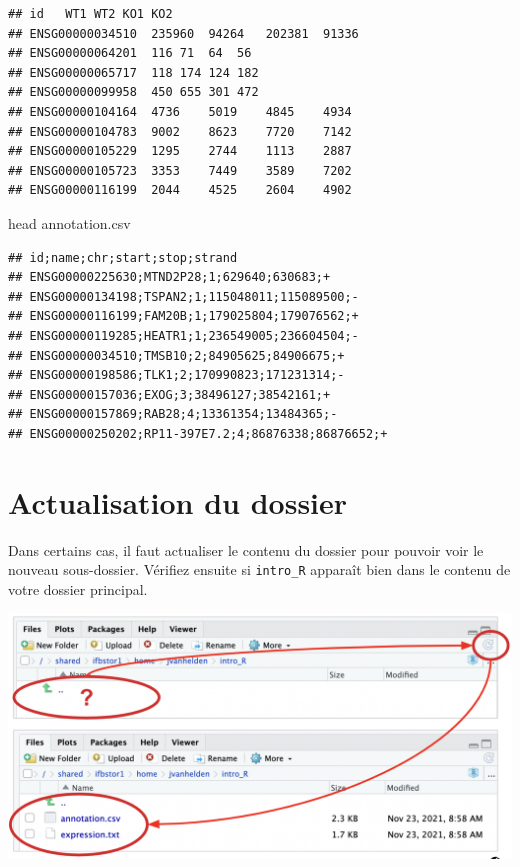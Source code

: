 \documentclass[
]{book}
\newenvironment{Shaded}{\begin{snugshade}}{\end{snugshade}}
\newcommand{\FunctionTok}[1]{\textcolor[rgb]{0.00,0.00,0.00}{#1}}
\newcommand{\NormalTok}[1]{#1}
\begin{document}
\begin{verbatim}
## id   WT1 WT2 KO1 KO2
## ENSG00000034510  235960  94264   202381  91336
## ENSG00000064201  116 71  64  56
## ENSG00000065717  118 174 124 182
## ENSG00000099958  450 655 301 472
## ENSG00000104164  4736    5019    4845    4934
## ENSG00000104783  9002    8623    7720    7142
## ENSG00000105229  1295    2744    1113    2887
## ENSG00000105723  3353    7449    3589    7202
## ENSG00000116199  2044    4525    2604    4902
\end{verbatim}

\begin{Shaded}
\begin{Highlighting}[]
\FunctionTok{head}\NormalTok{ annotation.csv}
\end{Highlighting}
\end{Shaded}

\begin{verbatim}
## id;name;chr;start;stop;strand
## ENSG00000225630;MTND2P28;1;629640;630683;+
## ENSG00000134198;TSPAN2;1;115048011;115089500;-
## ENSG00000116199;FAM20B;1;179025804;179076562;+
## ENSG00000119285;HEATR1;1;236549005;236604504;-
## ENSG00000034510;TMSB10;2;84905625;84906675;+
## ENSG00000198586;TLK1;2;170990823;171231314;-
## ENSG00000157036;EXOG;3;38496127;38542161;+
## ENSG00000157869;RAB28;4;13361354;13484365;-
## ENSG00000250202;RP11-397E7.2;4;86876338;86876652;+
\end{verbatim}

\hypertarget{actualisation-du-dossier}{%
\section{Actualisation du dossier}\label{actualisation-du-dossier}}

Dans certains cas, il faut actualiser le contenu du dossier pour pouvoir voir le nouveau sous-dossier.
Vérifiez ensuite si \texttt{intro\_R} apparaît bien dans le contenu de votre dossier principal.

\includegraphics{images/actualiser.png}
\end{document}
